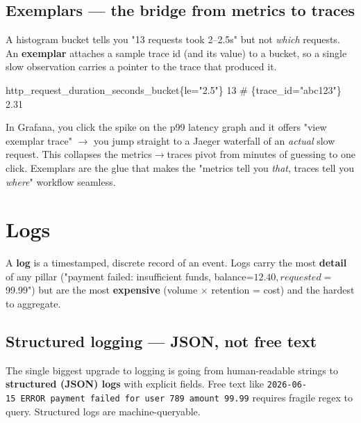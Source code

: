\documentclass[11pt]{article}
\newenvironment{Shaded}{\begin{snugshade}}{\end{snugshade}}
\newcommand{\CommentTok}[1]{\textcolor[rgb]{0.48,0.49,0.49}{#1}}
\newcommand{\DecValTok}[1]{\textcolor[rgb]{0.96,0.45,0.00}{#1}}
\newcommand{\NormalTok}[1]{\textcolor[rgb]{0.81,0.81,0.76}{#1}}
\newcommand{\OperatorTok}[1]{\textcolor[rgb]{0.81,0.81,0.76}{#1}}
\newcommand{\StringTok}[1]{\textcolor[rgb]{0.96,0.31,0.31}{#1}}
\begin{document}
\subsection{Exemplars --- the bridge from metrics to traces}\label{exemplars--the-bridge-from-metrics-to-traces}

A histogram bucket tells you "13 requests took 2--2.5s" but not \emph{which} requests. An \textbf{exemplar} attaches a sample trace id (and its value) to a bucket, so a single slow observation carries a pointer to the trace that produced it.


\begin{Shaded}
\begin{Highlighting}[]
\NormalTok{http\_request\_duration\_seconds\_bucket\{le}\OperatorTok{=}\StringTok{"2.5"}\NormalTok{\} }\DecValTok{13} \CommentTok{\# \{trace\_id="abc123"\} 2.31}
\end{Highlighting}
\end{Shaded}

In Grafana, you click the spike on the p99 latency graph and it offers "view exemplar trace" \(\rightarrow\) you jump straight to a Jaeger waterfall of an \emph{actual} slow request. This collapses the metrics\(\rightarrow\)traces pivot from minutes of guessing to one click. Exemplars are the glue that makes the "metrics tell you \emph{that}, traces tell you \emph{where}" workflow seamless.

\section{Logs}\label{logs}

A \textbf{log} is a timestamped, discrete record of an event. Logs carry the most \textbf{detail} of any pillar ("payment failed: insufficient funds, balance=\(12.40, requested=\)99.99") but are the most \textbf{expensive} (volume \(\times\) retention = cost) and the hardest to aggregate.

\subsection{Structured logging --- JSON, not free text}\label{structured-logging--json-not-free-text}

The single biggest upgrade to logging is going from human-readable strings to \textbf{structured (JSON) logs} with explicit fields. Free text like \texttt{2026-06-15\ ERROR\ payment\ failed\ for\ user\ 789\ amount\ 99.99} requires fragile regex to query. Structured logs are machine-queryable.
\end{document}
